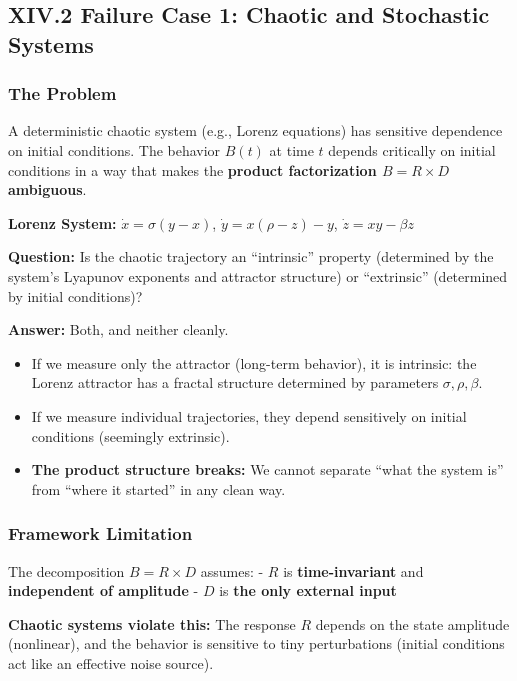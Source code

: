 \documentclass[
]{article}
\providecommand{\tightlist}{%
  \setlength{\itemsep}{0pt}\setlength{\parskip}{0pt}}
\begin{document}
\subsection{XIV.2 Failure Case 1: Chaotic and Stochastic
Systems}\label{xiv.2-failure-case-1-chaotic-and-stochastic-systems}

\subsubsection{The Problem}\label{the-problem}

A deterministic chaotic system (e.g., Lorenz equations) has sensitive
dependence on initial conditions. The behavior \(B(t)\) at time \(t\)
depends critically on initial conditions in a way that makes the
\textbf{product factorization \(B = R \times D\) ambiguous}.

\textbf{Lorenz System:} \(\dot{x} = \sigma(y - x)\),
\(\dot{y} = x(\rho - z) - y\), \(\dot{z} = xy - \beta z\)

\textbf{Question:} Is the chaotic trajectory an ``intrinsic'' property
(determined by the system's Lyapunov exponents and attractor structure)
or ``extrinsic'' (determined by initial conditions)?

\textbf{Answer:} Both, and neither cleanly.

\begin{itemize}
\tightlist
\item
  If we measure only the attractor (long-term behavior), it is
  intrinsic: the Lorenz attractor has a fractal structure determined by
  parameters \(\sigma, \rho, \beta\).
\item
  If we measure individual trajectories, they depend sensitively on
  initial conditions (seemingly extrinsic).
\item
  \textbf{The product structure breaks:} We cannot separate ``what the
  system is'' from ``where it started'' in any clean way.
\end{itemize}

\subsubsection{Framework Limitation}\label{framework-limitation}

The decomposition \(B = R \times D\) assumes: - \(R\) is
\textbf{time-invariant} and \textbf{independent of amplitude} - \(D\) is
\textbf{the only external input}

\textbf{Chaotic systems violate this:} The response \(R\) depends on the
state amplitude (nonlinear), and the behavior is sensitive to tiny
perturbations (initial conditions act like an effective noise source).
\end{document}
